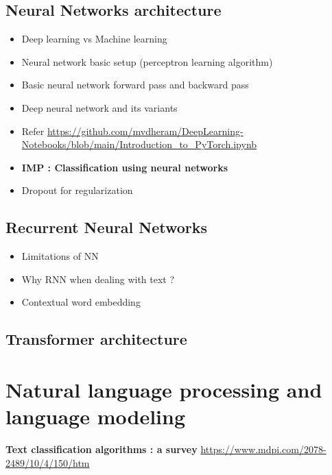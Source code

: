\subsection{Neural Networks architecture}
    \begin{itemize}
        \item Deep learning vs Machine learning 
        \item Neural network basic setup (perceptron learning algorithm)
        \item Basic neural network forward pass and backward pass
        \item  Deep neural network and its variants
        \item Refer \url{https://github.com/mvdheram/DeepLearning-Notebooks/blob/main/Introduction_to_PyTorch.ipynb}
        \item \textbf{IMP : Classification using neural networks} 
        \item Dropout for regularization 
    \end{itemize}
\subsection { Recurrent Neural Networks }
            \begin{itemize}
                \item Limitations of NN 
                \item Why RNN when dealing with text ?
                \item Contextual word embedding
            \end{itemize}

\subsection{Transformer architecture}
    
\section{Natural language processing and language modeling}
    \textbf{Text classification algorithms : a survey }\url{https://www.mdpi.com/2078-2489/10/4/150/htm}
